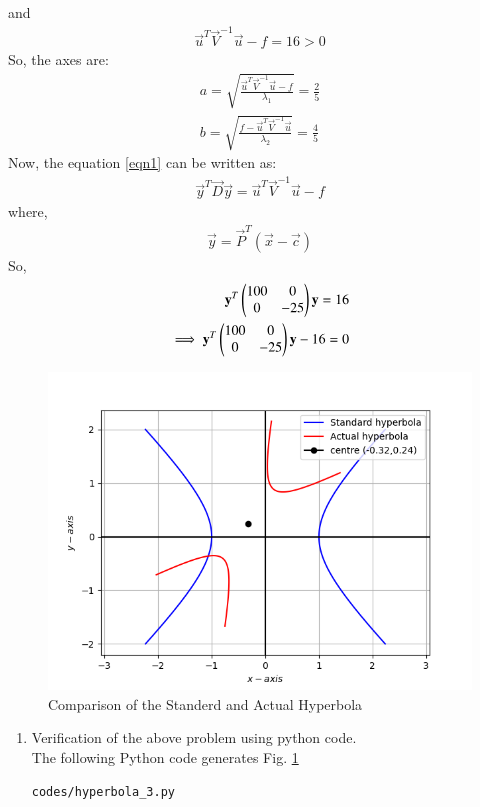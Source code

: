 \documentclass[journal,12pt,twocolumn]{IEEEtran}
\renewcommand\thesection{\arabic{section}}
\begin{document}
and 
\begin{align}
\vec{u}^T\vec{V}^{-1}\vec{u}-f=16>0
\end{align}
So, the axes are:
\begin{align}
a=\sqrt{\frac{\vec{u}^T\vec{V}^{-1}\vec{u}-f}{\lambda_1}} = \frac{2}{5}\\
b=\sqrt{\frac{f-\vec{u}^T\vec{V}^{-1}\vec{u}}{\lambda_2}} = \frac{4}{5}
\end{align}
Now, the equation \ref{eqn1} can be written as:
\begin{align}
\vec{y}^T\vec{D}\vec{y}=\vec{u}^T\vec{V}^{-1}\vec{u}-f
\end{align}
where, 
\begin{align}
\vec{y}= \vec{P}^T (\vec{x}-\vec{c})
\end{align}
So, 
\begin{align}
\mathbf{y}^T\begin{pmatrix}100 & 0\\0 & -25\end{pmatrix}\mathbf{y}=16\\
\implies \mathbf{y}^T\begin{pmatrix}100 & 0\\0 & -25\end{pmatrix}\mathbf{y}-16=0
\end{align}

\begin{figure}[!ht]
\centering
\includegraphics[width=\columnwidth]{./figs/hyperbola_2.png}
\caption{Comparison of the Standerd and Actual Hyperbola}
\label{fig:hyperbola}
\end{figure}
\renewcommand{\theequation}{\theenumi}
\begin{enumerate}[label=\thesection.\arabic*.,ref=\thesection.\theenumi]
\item Verification of the above problem using python code.\\
\solution The  following Python code generates Fig. \ref{fig:hyperbola}
\begin{lstlisting}
codes/hyperbola_3.py
\end{lstlisting}
%
\end{enumerate}
\end{document}
